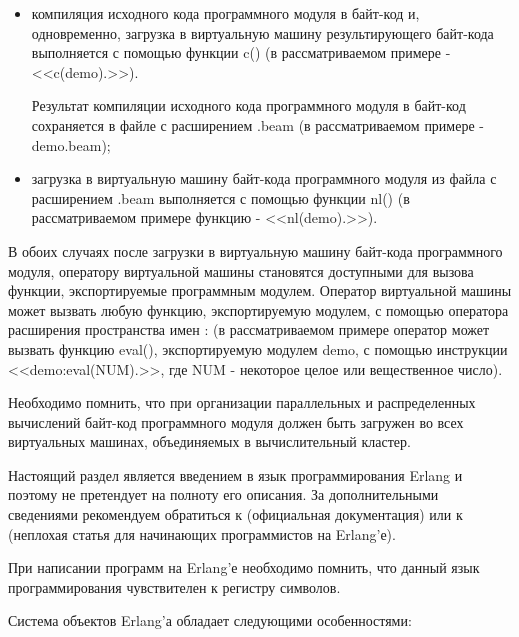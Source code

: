 \begin{itemize}
	\begin{itemize}

		\item компиляция исходного кода программного модуля в байт-код и, одновременно, загрузка в виртуальную машину результирующего байт-кода выполняется с помощью функции c() (в рассматриваемом примере - <<c(demo).>>).

		Результат компиляции исходного кода программного модуля в байт-код сохраняется в файле с расширением .beam (в рассматриваемом примере - demo.beam);

		\item загрузка в виртуальную машину байт-кода программного модуля из файла с расширением .beam выполняется с помощью функции nl() (в рассматриваемом примере функцию - <<nl(demo).>>).

	\end{itemize}

	В обоих случаях после загрузки в виртуальную машину байт-кода программного модуля, оператору виртуальной машины становятся доступными для вызова функции, экспортируемые программным модулем. Оператор виртуальной машины может вызвать любую функцию, экспортируемую модулем, с помощью оператора расширения пространства имен : (в рассматриваемом примере оператор может вызвать функцию eval(), экспортируемую модулем demo, с помощью инструкции <<demo:eval(NUM).>>, где NUM - некоторое целое или вещественное число).

	Необходимо помнить, что при организации параллельных и распределенных вычислений байт-код программного модуля должен быть загружен во всех виртуальных машинах, объединяемых в вычислительный кластер.

\end{itemize}


Настоящий раздел является введением в язык программирования Erlang и поэтому не претендует на полноту его описания. За дополнительными сведениями рекомендуем обратиться к \cite{erlang-doc} (официальная документация) или к \cite{erlang-rsdn} (неплохая статья для начинающих программистов на Erlang'е).

При написании программ на Erlang'е необходимо помнить, что данный язык программирования чувствителен к регистру символов.


Система объектов Erlang'а обладает следующими особенностями:

